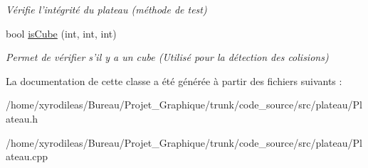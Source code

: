 \begin{DoxyCompactItemize}
\begin{DoxyCompactList}\small\item\em Vérifie l'intégrité du plateau (méthode de test) \end{DoxyCompactList}\item 
\hypertarget{classPlateau_a8ae0bfe889dd6612ef0054f2e04ed5be}{bool \hyperlink{classPlateau_a8ae0bfe889dd6612ef0054f2e04ed5be}{is\-Cube} (int, int, int)}\label{classPlateau_a8ae0bfe889dd6612ef0054f2e04ed5be}

\begin{DoxyCompactList}\small\item\em Permet de vérifier s'il y a un cube (Utilisé pour la détection des colisions) \end{DoxyCompactList}\end{DoxyCompactItemize}


La documentation de cette classe a été générée à partir des fichiers suivants \-:\begin{DoxyCompactItemize}
\item 
/home/xyrodileas/\-Bureau/\-Projet\-\_\-\-Graphique/trunk/code\-\_\-source/src/plateau/Plateau.\-h\item 
/home/xyrodileas/\-Bureau/\-Projet\-\_\-\-Graphique/trunk/code\-\_\-source/src/plateau/Plateau.\-cpp\end{DoxyCompactItemize}
